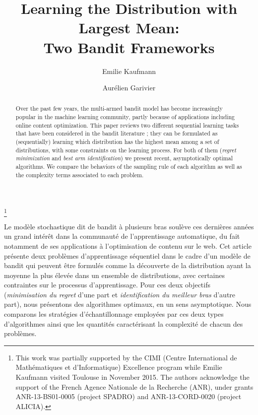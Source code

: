 \documentclass[proc]{edpsmath}
\begin{document}
	
	\title{Learning the Distribution with Largest Mean: \\ Two Bandit Frameworks}\thanks{This work was partially supported by the CIMI (Centre International de Math\'ematiques et d'{In\-for\-ma\-tique}) Excellence program while Emilie Kaufmann visited Toulouse in November 2015.
		The authors acknowledge the support of the French Agence Nationale de la Recherche (ANR), under grants ANR-13-BS01-0005 (project SPADRO) and ANR-13-CORD-0020 (project ALICIA).}%
	\author{Emilie Kaufmann}\address{CNRS \& Univ. Lille, UMR 9189 (CRIStAL), Inria Lille Nord-Europe (SequeL), \texttt{emilie.kaufmann@univ-lille1.fr}}
	\author{Aur\'elien Garivier}\address{Institut de Math\'ematiques de Toulouse, UMR 5219, Universit\'e de Toulouse, CNRS, \texttt{aurelien.garivier@math.univ-toulouse.fr}}
	\begin{abstract} Over the past few years, the multi-armed bandit model has become increasingly popular in the machine learning community, partly because of applications including online content optimization. This paper reviews two different sequential learning tasks that have been considered in the bandit literature ; they can be formulated as (sequentially) learning which distribution has the highest mean among a set of distributions, with some constraints on the learning process. For both of them (\emph{regret minimization} and \emph{best arm identification}) we present recent, asymptotically optimal algorithms. We compare the behaviors of the sampling rule of each algorithm as well as the complexity terms associated to each problem.\end{abstract}
	\begin{resume} Le mod\`ele stochastique dit de bandit \`a plusieurs bras soul\`eve ces derni\`eres ann\'ees un grand int\'er\^et dans la communaut\'e de l'apprentissage automatique, du fait notamment de ses applications \`a l'optimisation de contenu sur le web. Cet article pr\'esente deux probl\`emes d'apprentissage s\'equentiel dans le cadre d'un mod\`ele de bandit qui peuvent \^etre formul\'es comme la d\'ecouverte de la distribution ayant la moyenne la plus \'elev\'ee dans un ensemble de distributions, avec certaines contraintes sur le processus d'apprentissage. Pour ces deux objectifs (\emph{minimisation du regret} d'une part et \emph{identification du meilleur bras} d'autre part), nous pr\'esentons des algorithmes optimaux, en un sens asymptotique. Nous comparons les strat\'egies d'\'echantillonnage employ\'ees par ces deux types d'algorithmes ainsi que les quantit\'es caract\'erisant la complexit\'e de chacun des probl\`emes. \end{resume}
	\maketitle
\end{document}
